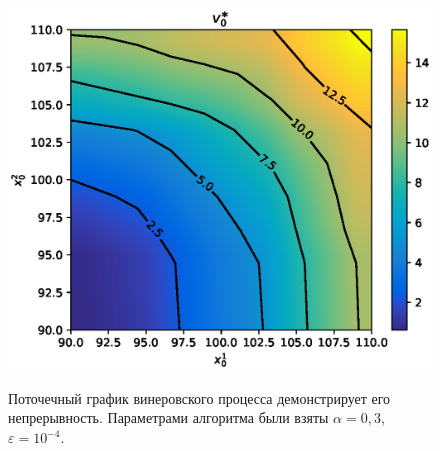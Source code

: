 \documentclass[a4paper, 12pt]{article}
\theoremstyle{def}
\theoremstyle{th}
\theoremstyle{rem}
\begin{document}
    \begin{figure}[t]
        \noindent
        \centering
        {
                \includegraphics[width=120mm]{depends_on_start.eps}
        }
        \caption{Поточечный график винеровского процесса демонстрирует его непрерывность. Параметрами алгоритма были взяты $\alpha = 0,\!3$, $\varepsilon = 10^{-4}$.}
    \end{figure}
\end{document}
